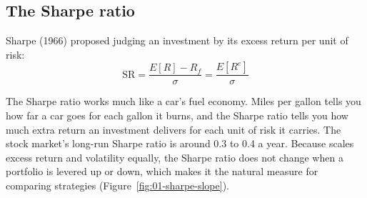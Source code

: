 \subsection{The Sharpe ratio}
\label{sec:01-sharpe}

Sharpe (1966) proposed judging an investment by its excess return per unit of risk:
\begin{equation}
  \mathrm{SR} = \frac{E[R] - R_f}{\sigma} = \frac{E[R^{e}]}{\sigma}
  \label{eq:01-sr}
\end{equation}

The Sharpe ratio works much like a car's fuel economy. Miles per gallon tells you how far a car goes for each gallon it burns, and the Sharpe ratio tells you how much extra return an investment delivers for each unit of risk it carries. The stock market's long-run Sharpe ratio is around 0.3 to 0.4 a year. Because  scales excess return and volatility equally, the Sharpe ratio does not change when a portfolio is levered up or down, which makes it the natural measure for comparing strategies (Figure~\ref{fig:01-sharpe-slope}).



